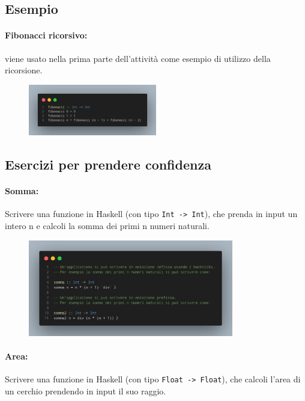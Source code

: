 \subsection{Esempio}

\paragraph{Fibonacci ricorsivo:} viene usato nella prima parte dell'attività come esempio
di utilizzo della ricorsione.

\begin{figure}[!h]
    \centering
    \includegraphics[width=0.5\textwidth]{images/Fibonacci.png}
\end{figure}

\subsection{Esercizi per prendere confidenza}

\paragraph{Somma:} Scrivere una funzione in Haskell (con tipo \texttt{Int -> Int}), 
che prenda in input un intero n e calcoli la somma dei primi n numeri naturali.

\begin{figure}[!h]
    \centering
    \includegraphics[width=0.8\textwidth]{images/Somma.png}
\end{figure}

\paragraph{Area:} Scrivere una funzione in Haskell (con tipo \texttt{Float -> Float}), 
che calcoli l'area di un cerchio prendendo in input il suo raggio.

